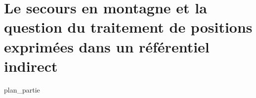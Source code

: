 \part{Le secours en montagne et la question du traitement de positions exprimées dans un référentiel indirect}
\label{part:01}
{plan_partie}

